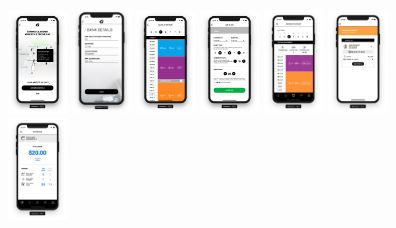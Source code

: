 \begin{figure}[H]
    \includegraphics[width=0.14\textwidth]{pfc/figuras/gym-welcome.png}
    \includegraphics[width=0.14\textwidth]{pfc/figuras/bank-details.png}
    \includegraphics[width=0.14\textwidth]{pfc/figuras/gym-block-structure.png}
    \includegraphics[width=0.14\textwidth]{pfc/figuras/gym-add-block.png}
    \includegraphics[width=0.14\textwidth]{pfc/figuras/gym-booking-calendar.png}
    \includegraphics[width=0.14\textwidth]{pfc/figuras/gym-booking-detail.png}
    \includegraphics[width=0.14\textwidth]{pfc/figuras/gym-dashboard.png}

\end{figure}

